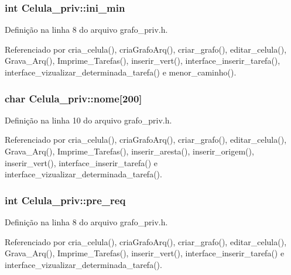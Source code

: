 \subsubsection[{ini\+\_\+min}]{\setlength{\rightskip}{0pt plus 5cm}int Celula\+\_\+priv\+::ini\+\_\+min}\label{structCelula__priv_a3c49601fe078bd7bb1512f0107af5301}


Definição na linha 8 do arquivo grafo\+\_\+priv.\+h.



Referenciado por cria\+\_\+celula(), cria\+Grafo\+Arq(), criar\+\_\+grafo(), editar\+\_\+celula(), Grava\+\_\+\+Arq(), Imprime\+\_\+\+Tarefas(), inserir\+\_\+vert(), interface\+\_\+inserir\+\_\+tarefa(), interface\+\_\+vizualizar\+\_\+determinada\+\_\+tarefa() e menor\+\_\+caminho().

\hypertarget{structCelula__priv_a7f33fa72aceed7b44922f0f39d6f7f59}{}
\subsubsection[{nome}]{\setlength{\rightskip}{0pt plus 5cm}char Celula\+\_\+priv\+::nome\mbox{[}200\mbox{]}}\label{structCelula__priv_a7f33fa72aceed7b44922f0f39d6f7f59}


Definição na linha 10 do arquivo grafo\+\_\+priv.\+h.



Referenciado por cria\+\_\+celula(), cria\+Grafo\+Arq(), criar\+\_\+grafo(), editar\+\_\+celula(), Grava\+\_\+\+Arq(), Imprime\+\_\+\+Tarefas(), inserir\+\_\+aresta(), inserir\+\_\+origem(), inserir\+\_\+vert(), interface\+\_\+inserir\+\_\+tarefa() e interface\+\_\+vizualizar\+\_\+determinada\+\_\+tarefa().

\hypertarget{structCelula__priv_a3ff8d3c4d0ba994771391320203619fc}{}
\subsubsection[{pre\+\_\+req}]{\setlength{\rightskip}{0pt plus 5cm}int Celula\+\_\+priv\+::pre\+\_\+req}\label{structCelula__priv_a3ff8d3c4d0ba994771391320203619fc}


Definição na linha 8 do arquivo grafo\+\_\+priv.\+h.



Referenciado por cria\+\_\+celula(), cria\+Grafo\+Arq(), criar\+\_\+grafo(), editar\+\_\+celula(), Grava\+\_\+\+Arq(), Imprime\+\_\+\+Tarefas(), inserir\+\_\+vert(), interface\+\_\+inserir\+\_\+tarefa() e interface\+\_\+vizualizar\+\_\+determinada\+\_\+tarefa().

